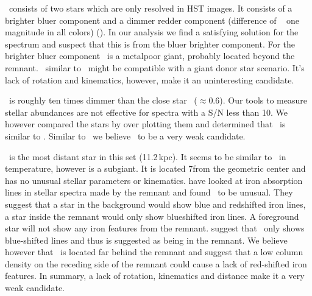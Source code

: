  \starc\ consists of two stars which are only resolved in HST images. It consists of a brighter bluer component and a dimmer redder component (difference of ~ one magnitude in all colors) (\rl). In our analysis we find a satisfying solution for the spectrum and suspect that this is from the bluer brighter component. 
For the brighter bluer component \starc\ is a metalpoor giant, probably located beyond the remnant. \starc\ similar to \stara\ might be compatible with a giant donor star scenario. It's lack of rotation and kinematics, however, make it an uninteresting candidate.

\stard\ is roughly ten times dimmer than the close star \starc\ ($\approx 0.6$\arcsec). Our tools to measure stellar abundances are not effective for spectra with a S/N less than 10. We however compared the stars by over plotting them and determined that \stard\ is similar to \starc. Similar to \starc\ we believe \stard\ to be a very weak candidate.

\stare\ is the most distant star in this set (11.2\,kpc). It seems to be similar to \starg\ in temperature, however is a subgiant. It is located 7\arcsec from the geometric center and has no unusual stellar parameters or kinematics. \citet{2007PASJ...59..811I} have looked at iron absorption lines in stellar spectra made by the remnant and found \stare\ to be unusual. They suggest that a star in the background would show blue and redshifted iron lines, a star inside the remnant would only show blueshifted iron lines.  A foreground star will not show any iron features from the remnant. \citet{2007PASJ...59..811I}  suggest that \stare\ only shows blue-shifted lines and thus is suggested as being in the remnant. We believe however that \stare\ is located far behind the remnant and suggest that a low column density on the receding side of the remnant could cause a lack of red-shifted iron features.  
In summary, a lack of rotation, kinematics and distance make it a very weak candidate.

